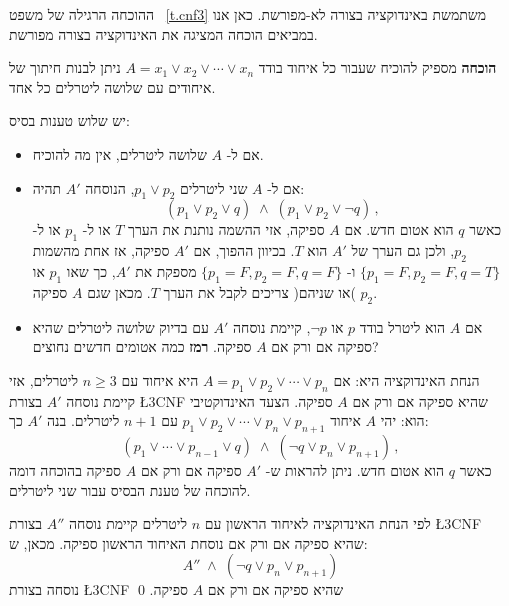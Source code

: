 \vspace*{-8pt}

ההוכחה הרגילה של משפט~%
\ref{t.cnf3}
משתמשת באינדוקציה בצורה לא-מפורשת. כאן אנו במביאים הוכחה המציגה את האינדוקציה בצורה מפורשת.

\textbf{הוכחה}
מספיק להוכיח שעבור כל איחוד בודד
$A=x_1 \vee x_2 \vee \cdots \vee x_n$
ניתן לבנות חיתוך של איחודים עם שלושה ליטרלים כל אחד.

יש שלוש טענות בסיס:
\begin{itemize}
\item 
אם ל-%
$A$
שלושה ליטרלים, אין מה להוכיח.
\item
אם ל-%
$A$
שני ליטרלים
$p_1\vee p_2$,
הנוסחה
$A'$
תהיה:
\[
(p_1 \vee p_2 \vee q) \;\wedge\; (p_1 \vee p_2 \vee \neg q)\,,
\]
כאשר
$q$
הוא אטום חדש. אם
$A$
ספיקה, אזי ההשמה נותנת את הערך
$T$
או ל-%
$p_1$
או ל-%
$p_2$,
ולכן גם הערך של
$A'$
הוא
$T$.
בכיוון ההפוך, אם 
$A'$
ספיקה, אז אחת מהשמות
$\{p_1=F,p_2=F,q=T\}$
ו-%
$\{p_1=F,p_2=F,q=F\}$
מספקת את 
$A'$,
כך שאו
$p_1$
או
$p_2$
)או שניהם( צריכים לקבל את הערך
$T$.
מכאן שגם
$A$
ספיקה.

\item
\begin{exercise}
אם
$A$
הוא ליטרל בודד
$p$
או
$\neg p$,
קיימת נוסחה 
$A'$
עם בדיוק שלושה ליטרלים שהיא ספיקה אם ורק אם 
$A$
ספיקה.
\textbf{רמז}
כמה אטומים חדשים נחוצים?
\end{exercise}
\end{itemize}

הנחת האינדוקציה היא: אם
$A=p_1 \vee p_2 \vee \cdots \vee p_n$
היא איחוד עם 
$n\geq 3$
ליטרלים, אזי קיימת נוסחה
$A'$
בצורת
\L{\small 3CNF}
שהיא ספיקה אם ורק אם
$A$
ספיקה. הצעד האינדוקטיבי הוא: יהי
$A$
איחוד
$p_1 \vee p_2 \vee \cdots \vee p_n \vee p_{n+1}$
עם
$n+1$
ליטרלים. בנה
$A'$
כך:
\begin{displaymath}
(p_1 \vee \cdots \vee p_{n-1} \vee q) \;\wedge\; (\neg q \vee p_n \vee p_{n+1})\,,
\end{displaymath}
כאשר
$q$
הוא אטום חדש. ניתן להראות ש-%
$A'$
ספיקה אם ורק אם
$A$
ספיקה בהוכחה דומה להוכחה של טענת הבסיס עבור שני ליטרלים.

לפי הנחת האינדוקציה לאיחוד הראשון עם
$n$
ליטרלים קיימת נוסחה
$A''$
בצורת
\L{\small 3CNF}
שהיא ספיקה אם ורק אם נוסחת האיחוד הראשון ספיקה. מכאן, ש:
\begin{displaymath}
A'' \;\wedge\; (\neg q \vee p_n \vee p_{n+1})
\end{displaymath}
נוסחה בצורת
\L{\small 3CNF}
שהיא ספיקה אם ורק אם
$A$
ספיקה.
\qed

